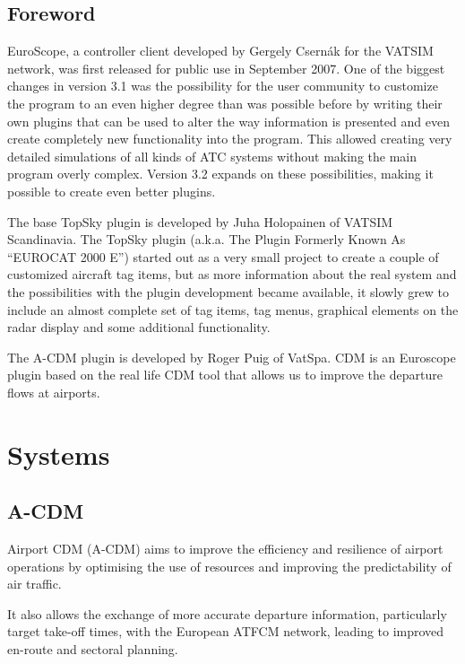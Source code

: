\documentclass[a4paper,oneside,11pt]{memoir}
\begin{document}
\section{Foreword}

EuroScope, a controller client developed by Gergely Csernák for the VATSIM network, was first released for public use in September 2007. One of the biggest changes in version 3.1 was the possibility for the user community to customize the program to an even higher degree than was possible before by writing their own plugins that can be used to alter the way information is presented and even create completely new functionality into the program. This allowed creating very detailed simulations of all kinds of ATC systems without making the main program overly complex. Version 3.2 expands on these possibilities, making it possible to create even better plugins.

\bigskip

The base TopSky plugin is developed by Juha Holopainen of VATSIM Scandinavia. The TopSky plugin (a.k.a. The Plugin Formerly Known As “EUROCAT 2000 E”) started out as a very small project to create a couple of customized aircraft tag items, but as more information about the real system and the possibilities with the plugin development became available, it slowly grew to include an almost complete set of tag items, tag menus, graphical elements on the radar display and some additional functionality.\cite{topskygen}

\bigskip

The A-CDM plugin is developed by Roger Puig of VatSpa. CDM is an Euroscope plugin based on the real life CDM tool that allows us to improve the departure flows at airports.\cite{cdm}

\chapter{Systems}

\section{A-CDM}

Airport CDM (A-CDM) aims to improve the efficiency and resilience of airport operations by optimising the use of resources and improving the predictability of air traffic. 

It also allows the exchange of more accurate departure information, particularly target take-off times, with the European ATFCM network, leading to improved en-route and sectoral planning.\cite{eurocontrol}
\end{document}
